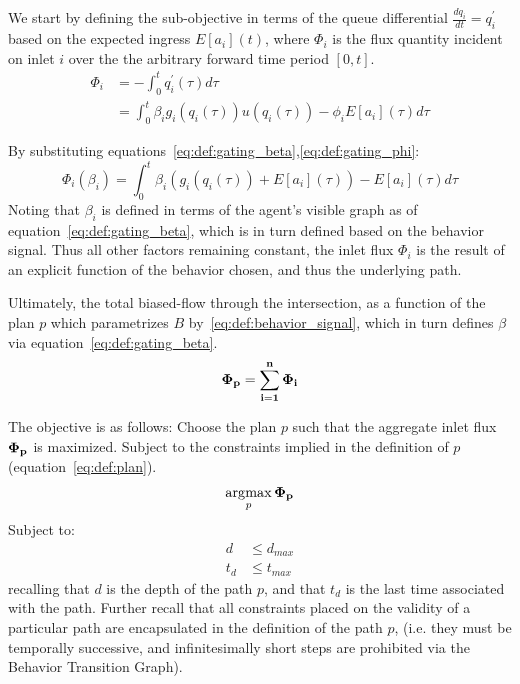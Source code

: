 \documentclass{report}
\DeclareMathOperator*{\argmax}{\arg\!\max}
\begin{document}
We start by defining the sub-objective in terms of the queue differential $\frac{dq_i}{dt} = q_i^\prime$ based on the expected ingress $E[a_i](t)$, where $\Phi_i$ is the flux quantity incident on inlet $i$ over the the arbitrary forward time period $[0, t]$.
\begin{align}\label{eq:def:sub_objective1}
	\Phi_i &= - \int_0^t q^\prime_i(\tau) d\tau\\
	&= \int_0^t \beta_i g_i(q_i(\tau)) u(q_i(\tau)) - \phi_i E\left[a_i\right](\tau) d\tau
\end{align}

By substituting equations~\eqref{eq:def:gating_beta},\eqref{eq:def:gating_phi}:
\begin{equation}\label{eq:def:sub_objective2}
	\Phi_i(\beta_i) = \int_0^t \beta_i \left(g_i(q_i(\tau)) + E[a_i](\tau)\right) - E[a_i](\tau) d\tau
\end{equation}
Noting that $\beta_i$ is defined in terms of the agent's visible graph as of equation~\eqref{eq:def:gating_beta}, which is in turn defined based on the behavior signal.
Thus all other factors remaining constant, the inlet flux $\Phi_i$ is the result of an explicit function of the behavior chosen, and thus the underlying path.

Ultimately, the total biased-flow through the intersection, as a function of the plan $p$ which parametrizes $B$ by~\eqref{eq:def:behavior_signal}, which in turn defines $\beta$ via equation~\eqref{eq:def:gating_beta}.
\begin{equation}\label{eq:def:biased_flow}
	\bf{\Phi}_p = \sum_{i=1}^n \Phi_i
\end{equation}

The objective is as follows: Choose the plan $p$ such that the aggregate inlet flux $\bf{\Phi}_p$ is maximized.
Subject to the constraints implied in the definition of $p$ (equation~\eqref{eq:def:plan}).
\begin{equation}\label{eq:def:combined_objective}
	\argmax_p \bf{\Phi}_p
\end{equation}
Subject to:
\begin{align}
	d &\leq d_{max}\\
	t_d &\leq t_{max}
\end{align}
recalling that $d$ is the depth of the path $p$, and that $t_d$ is the last time associated with the path.
Further recall that all constraints placed on the validity of a particular path are encapsulated in the definition of the path $p$, (i.e. they must be temporally successive, and infinitesimally short steps are prohibited via the Behavior Transition Graph).
\end{document}
